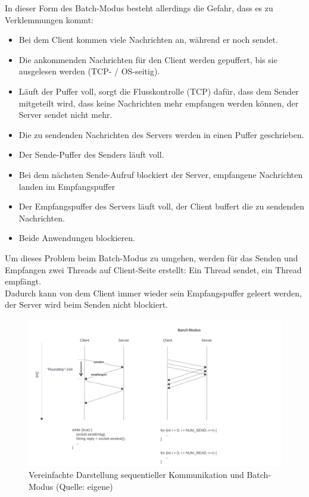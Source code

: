 \noindent
In dieser Form des Batch-Modus besteht allerdings die Gefahr, dass es zu Verklemmungen kommt:
\begin{itemize}
    \item Bei dem Client kommen viele Nachrichten an, während er noch sendet.
    \item Die ankommenden Nachrichten für den Client werden gepuffert, bis sie ausgelesen werden (TCP- / OS-seitig).
    \item Läuft der Puffer voll, sorgt die Flusskontrolle (TCP) dafür, dass dem Sender mitgeteilt wird, dass keine Nachrichten mehr empfangen werden können, der Server sendet nicht mehr.
    \item Die zu sendenden Nachrichten des Servers werden in einen Puffer geschrieben.
    \item Der Sende-Puffer des Senders läuft voll.
    \item Bei dem nächsten Sende-Aufruf blockiert der Server, empfangene Nachrichten landen im Empfangspuffer
    \item Der Empfangspuffer des Servers läuft voll, der Client buffert die zu sendenden Nachrichten.
    \item Beide Anwendungen blockieren.
\end{itemize}

\noindent
Um dieses Problem beim Batch-Modus zu umgehen, werden für das Senden und Empfangen zwei Threads auf Client-Seite erstellt: Ein Thread sendet, ein Thread empfängt. \\
Dadurch kann von dem Client immer wieder sein Empfangspuffer geleert werden, der Server wird beim Senden nicht blockiert.

\begin{figure}
    \centering
    \includegraphics[scale=0.4]{chapters/Anhang/Klausuren/img/batchmodus}
    \caption{Vereinfachte Darstellung sequentieller Kommunikation und Batch-Modus (Quelle: eigene)}
    \label{fig:batchmodus}
\end{figure}